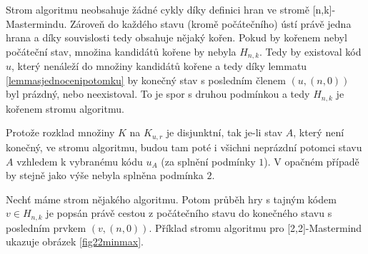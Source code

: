 




\begin{pozn}
    
    

    Strom algoritmu neobsahuje žádné cykly díky definici hran ve stromě [n,k]-Mastermindu. Zároveň do každého stavu (kromě počátečního) ústí právě jedna hrana a díky souvislosti tedy obsahuje nějaký kořen. Pokud by kořenem nebyl počáteční stav, množina kandidátů kořene by nebyla $H_{n,k}$. Tedy by existoval kód $u$, který nenáleží do množiny kandidátů kořene a tedy díky lemmatu \ref{lemmasjednocenipotomku} by konečný stav s posledním členem $(u, (n,0))$ byl prázdný, nebo neexistoval. To je spor s druhou podmínkou a tedy $H_{n,k}$ je kořenem stromu algoritmu. 

    Protože rozklad množiny $K$ na $K_{u,r}$ je disjunktní, tak je-li stav $A$, který není konečný, ve stromu algoritmu, budou tam poté i všichni neprázdní potomci stavu $A$ vzhledem k vybranému kódu $u_A$ (za splnění podmínky $1$). V opačném případě by stejně jako výše nebyla splněna podmínka $2$.
    
    Nechť máme strom nějakého algoritmu. Potom průběh hry s tajným kódem $v\in H_{n,k}$ je popsán právě cestou z počátečního stavu do konečného stavu s posledním prvkem $(v,(n,0))$. Příklad stromu algoritmu pro [2,2]-Mastermind ukazuje obrázek \ref{fig22minmax}. 
    

    
\end{pozn}

